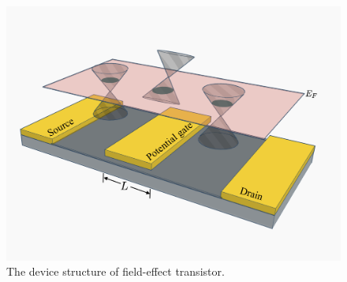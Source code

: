 
\begin{figure}[h]
    \begin{center}
    \includegraphics[scale=0.3]{fig/Transistor.png}
    \caption{\label{transistor} The device structure of field-effect transistor.}
    \end{center}
\end{figure}